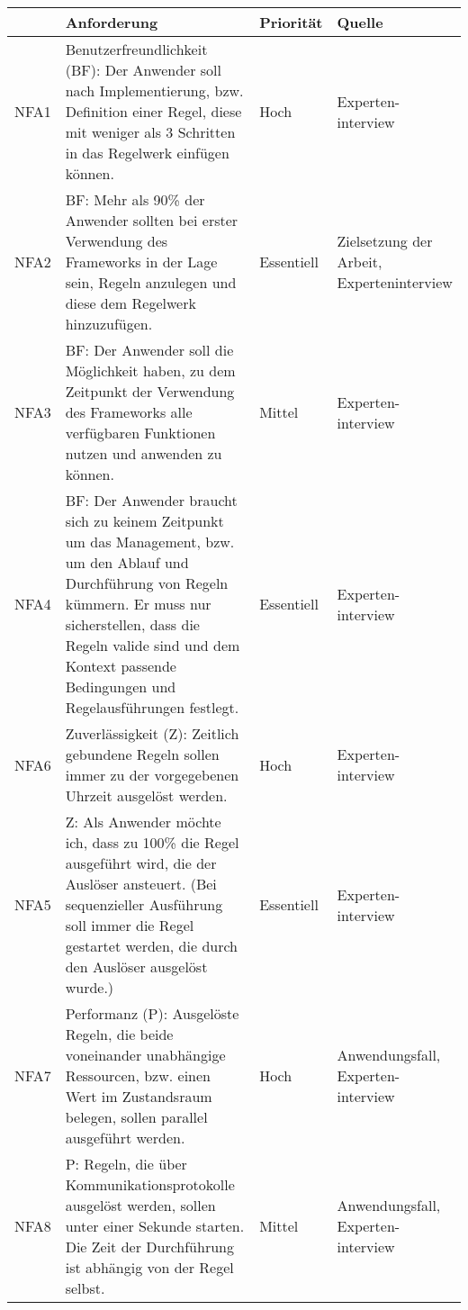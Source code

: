 \begin{table}[hbt!]
    \begin{center}
        \begin{tabular}{ | p{1.0cm} | p{9.7cm} | p{1.6cm} | p{2.6cm} | }
            \hline
                \textbf{} & \textbf{Anforderung} & \textbf{Priorität} & \textbf{Quelle} \\
            \hline
                NFA1 & Benutzerfreundlichkeit (BF): Der Anwender soll nach Implementierung, bzw. Definition einer Regel, diese mit weniger als 3 Schritten in das Regelwerk einfügen können. & Hoch & Experten-interview \\
            \hline
                NFA2 & BF: Mehr als 90\% der Anwender sollten bei erster Verwendung des Frameworks in der Lage sein, Regeln anzulegen und diese dem Regelwerk hinzuzufügen. & Essentiell & Zielsetzung der Arbeit, Experteninterview \\ 
            \hline
                NFA3 & BF: Der Anwender soll die Möglichkeit haben, zu dem Zeitpunkt der Verwendung des Frameworks alle verfügbaren Funktionen nutzen und anwenden zu können. & Mittel & Experten-interview \\ 
            \hline
                NFA4 & BF: Der Anwender braucht sich zu keinem Zeitpunkt um das Management, bzw. um den Ablauf und Durchführung von Regeln kümmern. Er muss nur sicherstellen, dass die Regeln valide sind und dem Kontext passende Bedingungen und Regelausführungen festlegt. & Essentiell & Experten-interview \\ 
            \hline
                NFA6 & Zuverlässigkeit (Z): Zeitlich gebundene Regeln sollen immer zu der vorgegebenen Uhrzeit ausgelöst werden. & Hoch & Experten-interview \\
            \hline
                NFA5 & Z: Als Anwender möchte ich, dass zu 100\% die Regel ausgeführt wird, die der Auslöser ansteuert. (Bei sequenzieller Ausführung soll immer die Regel gestartet werden, die durch den Auslöser ausgelöst wurde.) & Essentiell & Experten-interview \\
            \hline
                NFA7 & Performanz (P): Ausgelöste Regeln, die beide voneinander unabhängige Ressourcen, bzw. einen Wert im Zustandsraum belegen, sollen parallel ausgeführt werden. & Hoch & Anwendungsfall, Experten-interview \\ 
            \hline
                NFA8 & P: Regeln, die über Kommunikationsprotokolle ausgelöst werden, sollen unter einer Sekunde starten. Die Zeit der Durchführung ist abhängig von der Regel selbst. & Mittel & Anwendungsfall, Experten-interview \\ 

\end{tabular}
\end{center}
\end{table}
